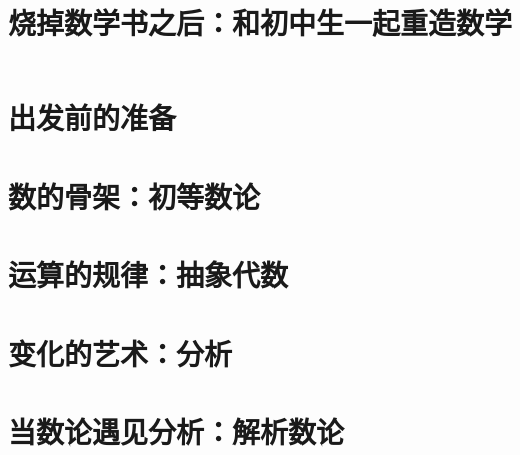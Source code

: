 \documentclass[UTF8,a4paper]{ctexbook}
\title{\heiti 烧掉数学书之后：和初中生一起重造数学}
\author{}
\date{}
\begin{document}
\frontmatter

\tableofcontents

\mainmatter

\part{出发前的准备}

\part{数的骨架：初等数论}

\part{运算的规律：抽象代数}

\part{变化的艺术：分析}

\part{当数论遇见分析：解析数论}
\end{document}
